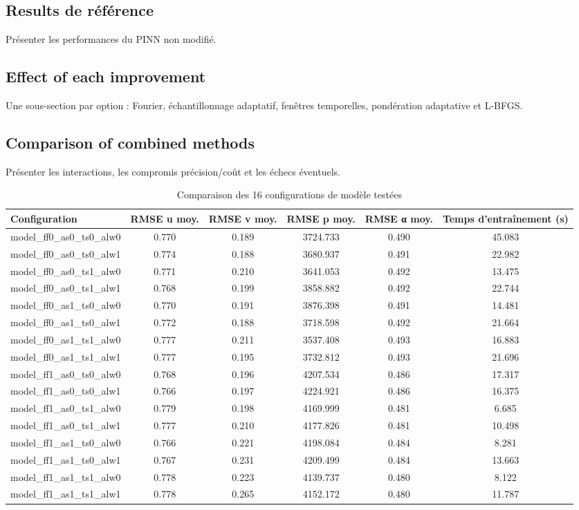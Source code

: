 \documentclass[11pt,a4paper]{article}
\begin{document}
\subsection{Results de référence}
Présenter les performances du PINN non modifié.
\subsection{Effect of each improvement}
Une sous-section par option : Fourier, échantillonnage adaptatif, fenêtres temporelles, pondération adaptative et L-BFGS.
\subsection{Comparison of combined methods}
Présenter les interactions, les compromis précision/coût et les échecs éventuels.

\begin{table}[h!]
\centering
\caption{Comparaison des 16 configurations de modèle testées}
\begin{tabular}{lccccc}
\toprule
Configuration & RMSE u moy. & RMSE v moy. & RMSE p moy. & RMSE α moy. & Temps d'entraînement (s) \\
\midrule
model\_ff0\_as0\_ts0\_alw0 & 0.770 & 0.189 & 3724.733 & 0.490 & 45.083 \\
model\_ff0\_as0\_ts0\_alw1 & 0.774 & 0.188 & 3680.937 & 0.491 & 22.982 \\
model\_ff0\_as0\_ts1\_alw0 & 0.771 & 0.210 & 3641.053 & 0.492 & 13.475 \\
model\_ff0\_as0\_ts1\_alw1 & 0.768 & 0.199 & 3858.882 & 0.492 & 22.744 \\
model\_ff0\_as1\_ts0\_alw0 & 0.770 & 0.191 & 3876.398 & 0.491 & 14.481 \\
model\_ff0\_as1\_ts0\_alw1 & 0.772 & 0.188 & 3718.598 & 0.492 & 21.664 \\
model\_ff0\_as1\_ts1\_alw0 & 0.777 & 0.211 & 3537.408 & 0.493 & 16.883 \\
model\_ff0\_as1\_ts1\_alw1 & 0.777 & 0.195 & 3732.812 & 0.493 & 21.696 \\
model\_ff1\_as0\_ts0\_alw0 & 0.768 & 0.196 & 4207.534 & 0.486 & 17.317 \\
model\_ff1\_as0\_ts0\_alw1 & 0.766 & 0.197 & 4224.921 & 0.486 & 16.375 \\
model\_ff1\_as0\_ts1\_alw0 & 0.779 & 0.198 & 4169.999 & 0.481 & 6.685 \\
model\_ff1\_as0\_ts1\_alw1 & 0.777 & 0.210 & 4177.826 & 0.481 & 10.498 \\
model\_ff1\_as1\_ts0\_alw0 & 0.766 & 0.221 & 4198.084 & 0.484 & 8.281 \\
model\_ff1\_as1\_ts0\_alw1 & 0.767 & 0.231 & 4209.499 & 0.484 & 13.663 \\
model\_ff1\_as1\_ts1\_alw0 & 0.778 & 0.223 & 4139.737 & 0.480 & 8.122 \\
model\_ff1\_as1\_ts1\_alw1 & 0.778 & 0.265 & 4152.172 & 0.480 & 11.787 \\
\bottomrule
\end{tabular}
\label{tab:benchmark_results}
\end{table}
\end{document}
